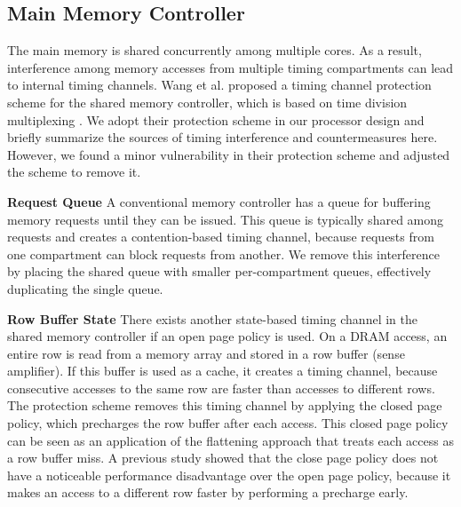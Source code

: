 \subsection{Main Memory Controller}

The main memory is shared concurrently among multiple cores. As a result,
interference among memory accesses from multiple timing compartments can lead
to internal timing channels. 
Wang et al. proposed a timing channel protection scheme for the shared memory
controller, which is based on time division multiplexing \cite{ushpca14}. 
We adopt their protection scheme in our processor design and briefly summarize 
the sources of timing interference and countermeasures here.
However, we found a minor vulnerability in their protection scheme and
adjusted the scheme to remove it.

\textbf{Request Queue}
A conventional memory controller has a queue for buffering memory requests until
they can be issued. This queue is typically shared among requests and creates
a contention-based timing channel, because requests from one compartment can block
requests from another. We remove this interference by placing the shared 
queue with smaller per-compartment queues, effectively duplicating the single queue.

\textbf{Row Buffer State}
There exists another state-based timing channel in the shared memory controller
if an open page policy is used. On a DRAM access, an entire row is read from
a memory array and stored in a row buffer (sense amplifier). If this buffer is
used as a cache, it creates a timing channel, because consecutive accesses to 
the same row are faster than accesses to different rows.
The protection scheme removes this timing channel by applying the closed page
policy, which precharges the row buffer after each access. This
closed page policy can be seen as an application of the flattening approach that
treats each access as a row buffer miss.
A previous study \cite{ushpca14} showed that the close page policy does
not have a noticeable performance disadvantage over the open page policy, because it
makes an access to a different row faster by performing a precharge early.

